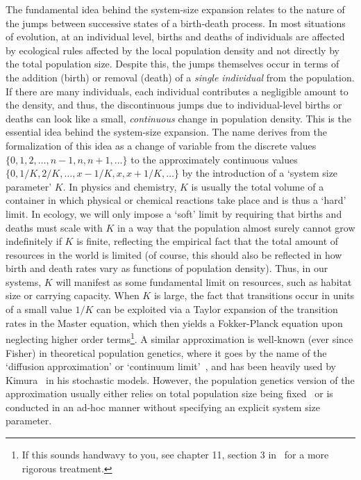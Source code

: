 The fundamental idea behind the system-size expansion relates to the nature of the jumps between successive states of a birth-death process. In most situations of evolution, at an individual level, births and deaths of individuals are affected by ecological rules affected by the local population density and not directly by the total population size. Despite this, the jumps themselves occur in terms of the addition (birth) or removal (death) of a \emph{single individual} from the population. If there are many individuals, each individual contributes a negligible amount to the density, and thus, the discontinuous jumps due to individual-level births or deaths can look like a small, \emph{continuous} change in population density. This is the essential idea behind the system-size expansion. The name derives from the formalization of this idea as a change of variable from the discrete values $\{0,1,2,\ldots,n-1,n,n+1,\ldots\}$ to the approximately continuous values $\{0,1/K,2/K,\dots,x-1/K,x,x+1/K,\ldots\}$ by the introduction of a `system size parameter' $K$. In physics and chemistry, $K$ is usually the total volume of a container in which physical or chemical reactions take place and is thus a `hard' limit. In ecology, we will only impose a `soft' limit by requiring that births and deaths must scale with $K$ in a way that the population almost surely cannot grow indefinitely if $K$ is finite, reflecting the empirical fact that the total amount of resources in the world is limited (of course, this should also be reflected in how birth and death rates vary as functions of population density). Thus, in our systems, $K$ will manifest as some fundamental limit on resources, such as habitat size or carrying capacity. When $K$ is large, the fact that transitions occur in units of a small value $1/K$ can be exploited via a Taylor expansion of the transition rates in the Master equation, which then yields a Fokker-Planck equation upon neglecting higher order terms\footnote{If this sounds handwavy to you, see chapter 11, section 3 in~\citet{ethier_markov_1986} for a more rigorous treatment.}. A similar approximation is well-known (ever since Fisher) in theoretical population genetics, where it goes by the name of the `diffusion approximation'\citep{ewens_mathematical_2004} or `continuum limit'~\citep{czuppon_understanding_2021}, and has been heavily used by Kimura~\citep{crow_introduction_1970} in his stochastic models. However, the population genetics version of the approximation usually either relies on total population size being fixed~\citep{crow_introduction_1970, lande_natural_1976,ewens_mathematical_2004} or is conducted in an ad-hoc manner without specifying an explicit system size parameter.

